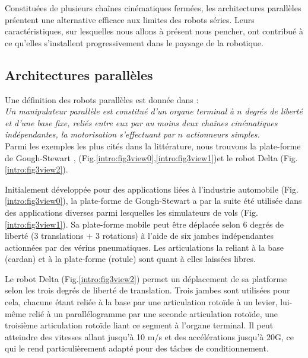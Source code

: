 Constitu\'ees de plusieurs cha\^ines cin\'ematiques ferm\'ees, les 
architectures parallèles pr\'sentent une alternative efficace aux limites des 
robots s\'eries.  Leurs caractéristiques, sur lesquel\-les nous allons \`a 
pr\'esent nous pencher, ont contribué à ce qu'elles s'installent 
progressivement 
dans le paysage de la robotique.

\subsection{Architectures parallèles} \label{chap0-0-2}

Une définition des robots parallèles est donnée dans \cite{merlet1997robots} :\\
{\it Un manipulateur parallèle est constitué d’un organe terminal à $n$ degrés 
de li\-berté et d’une base fixe, reliés entre eux par au moins deux chaînes
cinématiques indépendantes, la motorisation s’effectuant par $n$ actionneurs 
simples.}\\

Parmi les exemples les plus cités dans la littérature, nous trouvons 
la plate-forme de Gough-Stewart \cite{1956:Gough}, \cite{1965:Stewart} 
(Fig.\ref{intro:fig3view0},\ref{intro:fig3view1})et le 
robot Delta \cite{1988:Clavel} (Fig.\ref{intro:fig3view2}).

Initialement développée pour des applications li\'ees \`a l'industrie 
automobile (Fig.\ref{intro:fig3view0}), la plate-forme de Gough-Stewart a par 
la 
suite été utilisée dans des applications diverses parmi lesquelles les 
simulateurs de vols (Fig.\ref{intro:fig3view1}). Sa plate-forme mobile peut 
être déplacée selon 6 degrés de liberté (3 translations $+$ 3 rotations) à 
l'aide de six jambes indépendantes actionnées par des vérins pneumatiques. Les 
articulations la reliant à la base (cardan) et à la plate-forme (rotule) sont 
quant à elles laissées libres.

Le robot Delta (Fig.\ref{intro:fig3view2}) permet un déplacement de sa 
platforme 
selon les trois degrés de liberté de translation. Trois jambes sont utilisées 
pour cela, chacune étant reliée à la base par une articulation rotoïde à un 
levier, lui-même relié à un parallélogramme par une seconde articulation 
rotoïde, une troisième articulation rotoïde liant ce segment à l'organe 
terminal. Il peut atteindre des vitesses allant jusqu'à 10 m/s et des 
accélérations jusqu'à 20G, ce qui le rend particulièrement adapté pour des 
tâches de conditionnement. 

